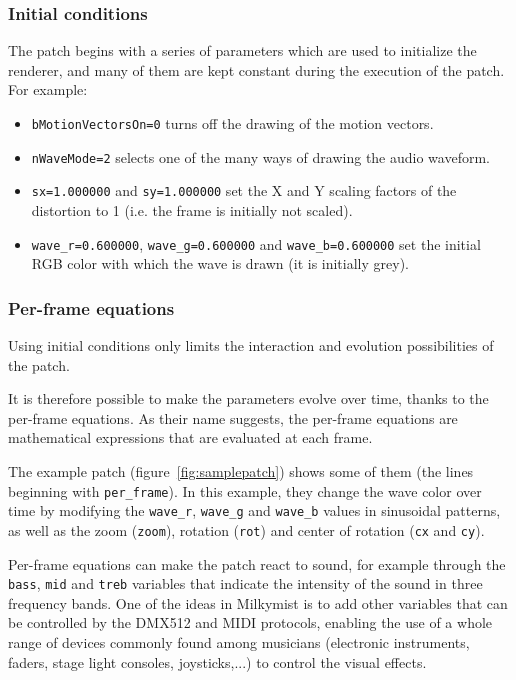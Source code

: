 \documentclass[a4paper,11pt]{kthesis}
\begin{document}
\subsubsection{Initial conditions}
The patch begins with a series of parameters which are used to initialize the renderer, and many of them are kept constant during the execution of the patch. For example:
\begin{itemize}
\item \verb!bMotionVectorsOn=0! turns off the drawing of the motion vectors.
\item \verb!nWaveMode=2! selects one of the many ways of drawing the audio waveform.
\item \verb!sx=1.000000! and \verb!sy=1.000000! set the X and Y scaling factors of the distortion to 1 (i.e. the frame is initially not scaled).
\item \verb!wave_r=0.600000!, \verb!wave_g=0.600000! and \verb!wave_b=0.600000! set the initial RGB color with which the wave is drawn (it is initially grey).
\end{itemize}

\subsubsection{Per-frame equations}
Using initial conditions only limits the interaction and evolution possibilities of the patch.

It is therefore possible to make the parameters evolve over time, thanks to the per-frame equations. As their name suggests, the per-frame equations are mathematical expressions that are evaluated at each frame.

The example patch (figure~\ref{fig:samplepatch}) shows some of them (the lines beginning with \verb!per_frame!). In this example, they change the wave color over time by modifying the \verb!wave_r!, \verb!wave_g! and \verb!wave_b! values in sinusoidal patterns, as well as the zoom (\verb!zoom!), rotation (\verb!rot!) and center of rotation (\verb!cx! and \verb!cy!).

Per-frame equations can make the patch react to sound, for example through the \verb!bass!, \verb!mid! and \verb!treb! variables that indicate the intensity of the sound in three frequency bands. One of the ideas in Milkymist is to add other variables that can be controlled by the DMX512 and MIDI protocols, enabling the use of a whole range of devices commonly found among musicians (electronic instruments, faders, stage light consoles, joysticks,...) to control the visual effects.
\end{document}

